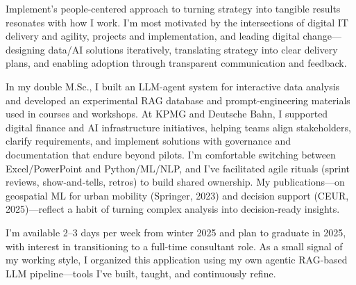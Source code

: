 Implement’s people-centered approach to turning strategy into tangible results resonates with how I work. I’m most motivated by the intersections of digital IT delivery and agility, projects and implementation, and leading digital change—designing data/AI solutions iteratively, translating strategy into clear delivery plans, and enabling adoption through transparent communication and feedback.

In my double M.Sc., I built an LLM-agent system for interactive data analysis and developed an experimental RAG database and prompt-engineering materials used in courses and workshops. At KPMG and Deutsche Bahn, I supported digital finance and AI infrastructure initiatives, helping teams align stakeholders, clarify requirements, and implement solutions with governance and documentation that endure beyond pilots. I’m comfortable switching between Excel/PowerPoint and Python/ML/NLP, and I’ve facilitated agile rituals (sprint reviews, show-and-tells, retros) to build shared ownership. My publications—on geospatial ML for urban mobility (Springer, 2023) and decision support (CEUR, 2025)—reflect a habit of turning complex analysis into decision-ready insights.

I’m available 2–3 days per week from winter 2025 and plan to graduate in 2025, with interest in transitioning to a full-time consultant role. As a small signal of my working style, I organized this application using my own agentic RAG-based LLM pipeline—tools I’ve built, taught, and continuously refine.